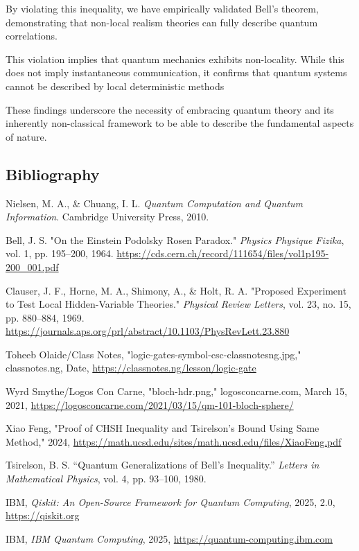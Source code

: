\documentclass[12pt]{article}
\begin{document}
By violating this inequality, we have empirically validated Bell's theorem, demonstrating that non-local realism theories can fully describe quantum correlations.

This violation implies that quantum mechanics exhibits non-locality. While this does not imply instantaneous communication, it confirms that quantum systems cannot be described by local deterministic methods

These findings underscore the necessity of embracing quantum theory and its inherently non-classical framework to be able to describe the fundamental aspects of nature. 

\newpage
\subsection{Bibliography}
\begin{thebibliography}{9}

     Nielsen, M. A., \& Chuang, I. L. \textit{Quantum Computation and Quantum Information}. Cambridge University Press, 2010.

     Bell, J. S. "On the Einstein Podolsky Rosen Paradox." \textit{Physics Physique Fizika}, vol. 1, pp. 195–200, 1964. \url{https://cds.cern.ch/record/111654/files/vol1p195-200_001.pdf}

     Clauser, J. F., Horne, M. A., Shimony, A., \& Holt, R. A. "Proposed Experiment to Test Local Hidden-Variable Theories." \textit{Physical Review Letters}, vol. 23, no. 15, pp. 880–884, 1969. \url{https://journals.aps.org/prl/abstract/10.1103/PhysRevLett.23.880}

     Toheeb Olaide/Class Notes, "logic-gates-symbol-csc-classnotesng.jpg," classnotes.ng, Date, \url{https://classnotes.ng/lesson/logic-gate}

     Wyrd Smythe/Logos Con Carne, "bloch-hdr.png," logosconcarne.com, March 15, 2021, \url{https://logosconcarne.com/2021/03/15/qm-101-bloch-sphere/}

     Xiao Feng, "Proof of CHSH Inequality and Tsirelson’s Bound Using Same Method," 2024, \url{https://math.ucsd.edu/sites/math.ucsd.edu/files/XiaoFeng.pdf}

     Tsirelson, B. S. “Quantum Generalizations of Bell’s Inequality.” \textit{Letters in Mathematical Physics}, vol. 4, pp. 93–100, 1980.

     IBM, \textit{Qiskit: An Open-Source Framework for Quantum Computing}, 2025, 2.0, \url{https://qiskit.org}

     IBM, \textit{IBM Quantum Computing}, 2025, \url{https://quantum-computing.ibm.com}

\end{thebibliography}
\end{document}
